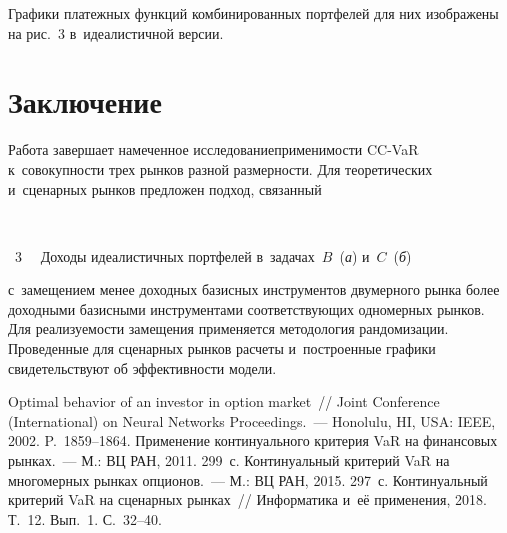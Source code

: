 \begin{multicols}{2}
  Графики платежных функций комбинированных портфелей для них 
изображены на рис.~3 в~идеалистичной версии.

  \vspace*{-6pt}
  
  \section{Заключение}
  
  \vspace*{-2pt}
  
  Работа завершает намеченное исследование\linebreak применимости CC-VaR 
к~совокупности трех рынков разной размерности. Для теоретических 
и~сценарных рынков предложен подход, связанный\linebreak\vspace*{-12pt}




{ \begin{center}  %
 \vspace*{-1pt}
    \mbox{%
 \epsfxsize=74.293mm 
 }

\end{center}

\noindent
{{\figurename~3}\ \ \small{
Доходы идеалистичных портфелей в~задачах~$B$~(\textit{а}) и~$C$~(\textit{б})
}}
}

\vspace*{12pt}


\noindent
 с~замещением менее 
доходных базисных инструментов двумерного рынка более доходными 
ба\-зисными инструментами соответствующих одномерных рынков. Для 
реализуемости замещения применяется методология рандомизации. 
Проведенные для сценарных рынков расчеты и~построенные графики 
свидетельствуют об эффективности модели.


\vspace*{-6pt} 
  
{\small\frenchspacing
 {%
 \begin{thebibliography}{9}
   Optimal behavior of an investor in option market~// 
  Joint 
Conference (International) on Neural Networks Proceedings.~--- Honolulu, HI,
USA:  IEEE,  2002. P.~1859--1864. 
   Применение континуального критерия VaR на финансовых 
рынках.~--- М.: ВЦ РАН, 2011. 299~с. 
   Континуальный критерий VaR на многомерных рынках  
опционов.~--- М.: ВЦ РАН, 2015. 297~с. 
   Континуальный критерий VaR на сценарных рынках~// 
Информатика и~её применения, 2018. Т.~12. Вып.~1. С.~32--40.


\end{thebibliography}}}
\end{multicols}
